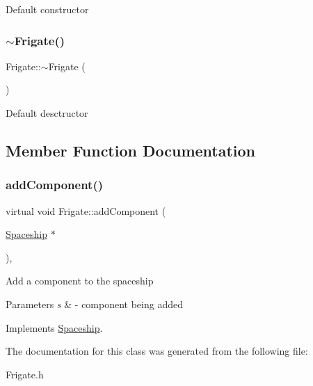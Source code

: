 Default constructor \mbox{\label{classFrigate_a86559f40e7725443c89039ee623fab2b}} 
\subsubsection{\texorpdfstring{$\sim$\+Frigate()}{~Frigate()}}
{\footnotesize\ttfamily Frigate\+::$\sim$\+Frigate (\begin{DoxyParamCaption}{ }\end{DoxyParamCaption})\hspace{0.3cm}{\ttfamily [inline]}}

Default desctructor 

\subsection{Member Function Documentation}
\mbox{\label{classFrigate_ae06208eed84e006385e4d337e1f04c7d}} 
\subsubsection{\texorpdfstring{add\+Component()}{addComponent()}}
{\footnotesize\ttfamily virtual void Frigate\+::add\+Component (\begin{DoxyParamCaption}\item[{\hyperlink{classSpaceship}{Spaceship} $\ast$}]{ }\end{DoxyParamCaption})\hspace{0.3cm}{\ttfamily [inline]}, {\ttfamily [virtual]}}

Add a component to the spaceship 
\begin{DoxyParams}{Parameters}
{\em s} & -\/ component being added \\
\hline
\end{DoxyParams}


Implements \hyperlink{classSpaceship_ac1b4673a691cd100708ddea08cd9f192}{Spaceship}.



The documentation for this class was generated from the following file\+:\begin{DoxyCompactItemize}
\item 
Frigate.\+h\end{DoxyCompactItemize}
